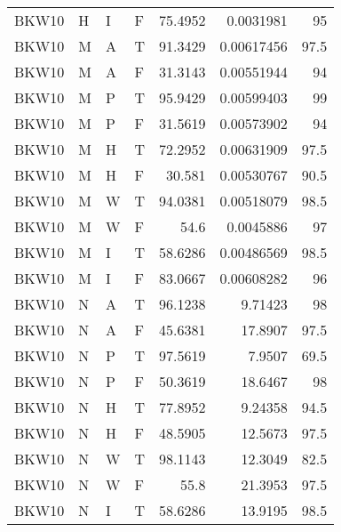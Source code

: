 \begin{longtable}{llllrrr}
    BKW10    & H         & I         & F          & 75.4952    & 0.0031981   & 95       \\
    BKW10    & M         & A         & T          & 91.3429    & 0.00617456  & 97.5     \\
    BKW10    & M         & A         & F          & 31.3143    & 0.00551944  & 94       \\
    BKW10    & M         & P         & T          & 95.9429    & 0.00599403  & 99       \\
    BKW10    & M         & P         & F          & 31.5619    & 0.00573902  & 94       \\
    BKW10    & M         & H         & T          & 72.2952    & 0.00631909  & 97.5     \\
    BKW10    & M         & H         & F          & 30.581     & 0.00530767  & 90.5     \\
    BKW10    & M         & W         & T          & 94.0381    & 0.00518079  & 98.5     \\
    BKW10    & M         & W         & F          & 54.6       & 0.0045886   & 97       \\
    BKW10    & M         & I         & T          & 58.6286    & 0.00486569  & 98.5     \\
    BKW10    & M         & I         & F          & 83.0667    & 0.00608282  & 96       \\
    BKW10    & N         & A         & T          & 96.1238    & 9.71423     & 98       \\
    BKW10    & N         & A         & F          & 45.6381    & 17.8907     & 97.5     \\
    BKW10    & N         & P         & T          & 97.5619    & 7.9507      & 69.5     \\
    BKW10    & N         & P         & F          & 50.3619    & 18.6467     & 98       \\
    BKW10    & N         & H         & T          & 77.8952    & 9.24358     & 94.5     \\
    BKW10    & N         & H         & F          & 48.5905    & 12.5673     & 97.5     \\
    BKW10    & N         & W         & T          & 98.1143    & 12.3049     & 82.5     \\
    BKW10    & N         & W         & F          & 55.8       & 21.3953     & 97.5     \\
    BKW10    & N         & I         & T          & 58.6286    & 13.9195     & 98.5     \\

\end{longtable}
